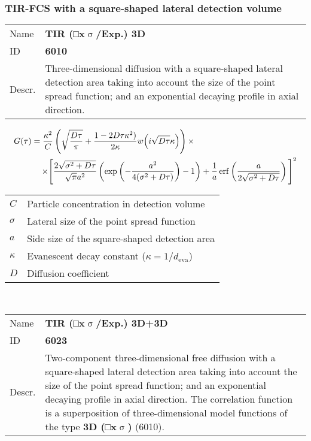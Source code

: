\subsubsection{TIR-FCS with a square-shaped lateral detection volume}


\noindent \begin{tabular}{lp{}}
Name & \textbf{TIR (□x$\upsigma$/Exp.) 3D} \\ 
ID & \textbf{6010} \\ 
Descr. &  Three-dimensional diffusion with a square-shaped lateral detection area taking into account the size of the point spread function; and an exponential decaying profile in axial direction\cite{Ries2008, Yordanov2011}. \\ 
\end{tabular}
\begin{align}
G(\tau) =  \frac{\kappa^2}{C} &
\left( \sqrt{\frac{D \tau}{\pi}} + \frac{1 - 2 D \tau \kappa^2)}{2 \kappa} w\!\left(i \sqrt{D \tau} \kappa\right) \right) \times \\
\notag  \times \Bigg[ & \frac{2 \sqrt{\sigma^2+D \tau}}{\sqrt{\pi} a^2}
\left( \exp\left(-\frac{a^2}{4(\sigma^2+D \tau)}\right) - 1 \right) +
\frac{1}{a} \, \mathrm{erf}\left(\frac{a}{2 \sqrt{\sigma^2+D \tau}}\right) \Bigg]^2
\end{align} 
\begin{center}
\begin{tabular}{ll}
$C$ & Particle concentration in detection volume \\ 
$\sigma$ & Lateral size of the point spread function \\ 
$a$ & Side size of the square-shaped detection area \\
$\kappa$ &  Evanescent decay constant ($\kappa = 1/d_\mathrm{eva}$)\\ 
$D$ & Diffusion coefficient \\
\end{tabular} \\
\end{center}
\vspace{2em}


\noindent \begin{tabular}{lp{}}
Name & \textbf{TIR (□x$\upsigma$/Exp.) 3D+3D} \\ 
ID & \textbf{6023} \\ 
Descr. &  Two-component three-dimensional free diffusion with a square-shaped lateral detection area taking into account the size of the point spread function; and an exponential decaying profile in axial direction. \newline
The correlation function is a superposition of three-dimensional model functions of the type \textbf{3D (□x$\upsigma$)} (6010)\cite{Ries2008, Yordanov2011}. \\
\end{tabular}
\vspace{2em}


